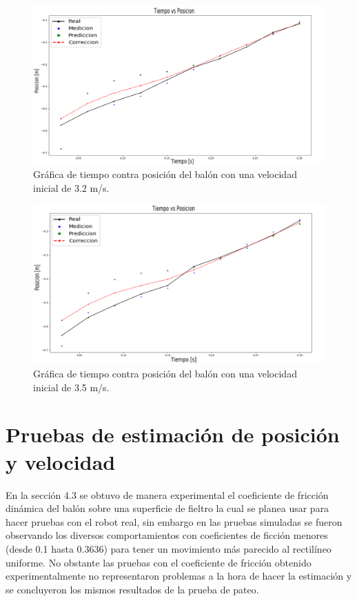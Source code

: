 \begin{figure}
\centering
	\includegraphics[scale=0.3]{images/test_vel_3dot2.png}
	\caption{Gráfica de tiempo contra posición del balón con una velocidad inicial de 3.2 m/s.}
	\label{fig:estimator_graphic_2}
\end{figure}

\begin{figure}
\centering
	\includegraphics[scale=0.3]{images/test_vel_3dot5.png}
	\caption{Gráfica de tiempo contra posición del balón con una velocidad inicial de 3.5 m/s.}	
	\label{fig:estimator_graphic_3}
\end{figure}
	
	\section[Pruebas de estimación]{Pruebas de estimación de posición y velocidad}
	
	En la sección 4.3 se obtuvo de manera experimental el coeficiente de fricción dinámica del balón sobre una superficie de fieltro la cual se planea usar para hacer pruebas con el robot real, sin embargo en las pruebas simuladas se fueron observando los diversos comportamientos con coeficientes de ficción menores (desde 0.1 hasta 0.3636) para tener un movimiento más parecido al rectilíneo uniforme. No obstante las pruebas con el coeficiente de fricción obtenido experimentalmente no representaron problemas a la hora de hacer la estimación y se concluyeron los mismos resultados de la prueba de pateo. 

